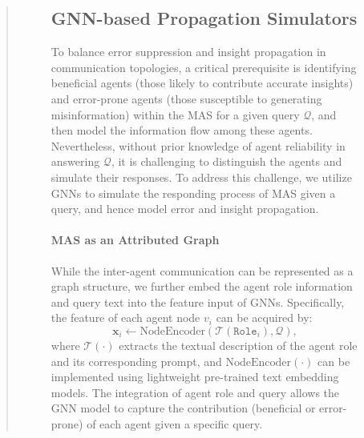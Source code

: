 \documentclass[11pt]{article}
\newcommand{\ourmethod}{\textsc{{EIB-Learner}}\xspace}
\begin{document}
\begin{abstract}
\begin{figure}[ht!]

\subsection{GNN-based Propagation Simulators}\label{GNN}

To balance error suppression and insight propagation in communication topologies, a critical prerequisite is identifying beneficial agents (those likely to contribute accurate insights) and error-prone agents (those susceptible to generating misinformation) within the MAS for a given query $\mathcal{Q}$, and then model the information flow among these agents. Nevertheless, without prior knowledge of agent reliability in answering $\mathcal{Q}$, it is challenging to distinguish the agents and simulate their responses. To address this challenge, we utilize GNNs to simulate the responding process of MAS given a query, and hence model error and insight propagation.

\paragraph{MAS as an Attributed Graph}
While the inter-agent communication can be represented as a graph structure, we further embed the agent role information and query text into the feature input of GNNs. Specifically, the feature of each agent node $v_i$ can be acquired by:
\begin{equation}
	\mathbf{x}_i \leftarrow \text{NodeEncoder}(\mathcal{T}(\texttt{Role}_{i}), \mathcal{Q}),
\end{equation}
where $\mathcal{T}(\cdot)$ extracts the textual description of the agent role and its corresponding prompt, and $\text{NodeEncoder}(\cdot)$ can be implemented using lightweight pre-trained text embedding models. The integration of agent role and query allows the GNN model to capture the contribution (beneficial or error-prone) of each agent given a specific query. 



\end{figure}
\end{abstract}
\end{document}
